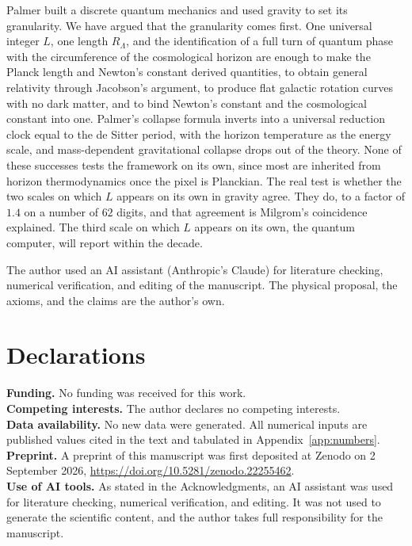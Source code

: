 \documentclass[aps,prd,twocolumn,superscriptaddress,nofootinbib,showkeys]{revtex4-2}
\begin{document}
Palmer built a discrete quantum mechanics and used gravity to set its granularity. We have argued that the granularity comes first. One universal integer $L$, one length $R_\Lambda$, and the identification of a full turn of quantum phase with the circumference of the cosmological horizon are enough to make the Planck length and Newton's constant derived quantities, to obtain general relativity through Jacobson's argument, to produce flat galactic rotation curves with no dark matter, and to bind Newton's constant and the cosmological constant into one. Palmer's collapse formula inverts into a universal reduction clock equal to the de Sitter period, with the horizon temperature as the energy scale, and mass-dependent gravitational collapse drops out of the theory. None of these successes tests the framework on its own, since most are inherited from horizon thermodynamics once the pixel is Planckian. The real test is whether the two scales on which $L$ appears on its own in gravity agree. They do, to a factor of $1.4$ on a number of $62$ digits, and that agreement is Milgrom's coincidence explained. The third scale on which $L$ appears on its own, the quantum computer, will report within the decade.

\begin{acknowledgments}
The author used an AI assistant (Anthropic's Claude) for literature checking, numerical verification, and editing of the manuscript. The physical proposal, the axioms, and the claims are the author's own.
\end{acknowledgments}

\section*{Declarations}
\noindent\textbf{Funding.} No funding was received for this work.\\
\textbf{Competing interests.} The author declares no competing interests.\\
\textbf{Data availability.} No new data were generated. All numerical inputs are published values cited in the text and tabulated in Appendix~\ref{app:numbers}.\\
\textbf{Preprint.} A preprint of this manuscript was first deposited at Zenodo on 2 September 2026, \url{https://doi.org/10.5281/zenodo.22255462}.\\
\textbf{Use of AI tools.} As stated in the Acknowledgments, an AI assistant was used for literature checking, numerical verification, and editing. It was not used to generate the scientific content, and the author takes full responsibility for the manuscript.
\end{document}
